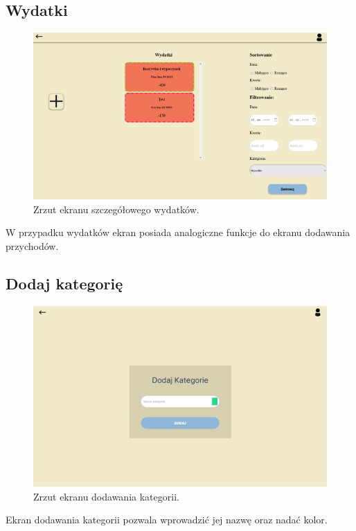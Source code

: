 \documentclass[12pt,a4paper,oneside]{article}
\begin{document}
\subsection{Wydatki}
\begin{figure}[H]
    \centering
    \includegraphics[width=\hsize,keepaspectratio]{images/expenses_card.png}
    \caption{Zrzut ekranu szczegółowego wydatków.}
\end{figure}
W przypadku wydatków ekran posiada analogiczne funkcje do ekranu dodawania
przychodów.

\subsection{Dodaj kategorię}
\begin{figure}[H]
    \centering
    \includegraphics[width=\hsize,keepaspectratio]{images/add_category.png}
    \caption{Zrzut ekranu dodawania kategorii.}
\end{figure}
Ekran dodawania kategorii pozwala wprowadzić jej nazwę oraz nadać kolor.
\end{document}
